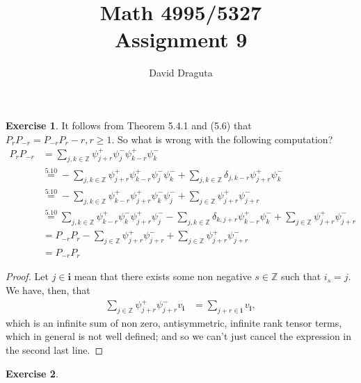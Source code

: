 \documentclass[12pt]{extarticle}
\title{ Math 4995/5327
  \\
  Assignment 9}
\author{David Draguta}
\newcommand{\Z}{\mathbb{Z}}
\newcommand{\<}{\langle}
\renewcommand{\>}{\rangle}
\theoremstyle{definition}
\newtheorem{exercise}{Exercise}
\begin{document}
\maketitle

\begin{exercise}
  It follows from Theorem 5.4.1 and (5.6) that $P_{r}P_{-r} = P_{-r}P_r - r, r \geq 1.$ So what is wrong with the following computation?
  \begin{align*}
    P_r P_{-r}
    &= \sum\limits_{j,k \in \Z} \psi_{j+r}^+ \psi_{j}^-\psi_{k-r}^+\psi_k^- \\
    &\overset{5.10}{=} - \sum\limits_{j,k \in \Z} \psi_{j+r}^+\psi_{k-r}^+\psi_j^-\psi_k^- + \sum\limits_{j,k \in \Z} \delta_{j,k-r}\psi_{j+r}^+\psi_k^- \\
    &\overset{5.10}{=} - \sum\limits_{j,k \in \Z} \psi_{k-r}^+\psi_{j+r}^+\psi_k^-\psi_j^- + \sum\limits_{j \in \Z} \psi_{j+r}^+\psi_{j+r}^- \\
    &\overset{5.10}{=} \sum\limits_{j,k \in \Z} \psi_{k-r}^+\psi_{k}^-\psi_{j+r}^+\psi_j^- - \sum\limits_{j,k \in \Z} \delta_{k,j+r}\psi_{k-r}^+\psi_k^- + \sum\limits_{j \in \Z} \psi_{j+r}^+ \psi_{j+r}^- \\
    &= P_{-r}P_{r} - \sum\limits_{j \in \Z} \psi_{j +r}^+\psi_{j+r}^- + \sum\limits_{j \in \Z} \psi_{j+r}^+\psi_{j+r}^-  \\
    &= P_{-r}P_{r}
  \end{align*}
\end{exercise}
\begin{proof}
  Let $j \in \mathbf{i}$ mean that there exists some non negative $s \in \Z$ such that $i_s = j$. We have, then, that  
  \begin{align*}
    \sum\limits_{j \in \Z} \psi_{j +r}^+\psi_{j+r}^- v_{\mathbf{i}}
    &=
    \sum\limits_{j+r \in \mathbf{i}} v_{\mathbf{i}},
  \end{align*}
  which is an infinite sum of non zero, antisymmetric, infinite rank tensor terms, which in general is not well defined; and so we can't just cancel the expression in the second last line.
\end{proof}

\begin{exercise}
  
\end{exercise}
\end{document}
